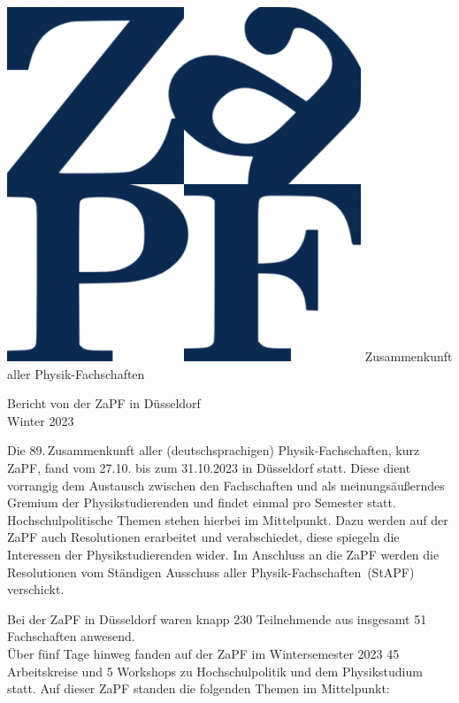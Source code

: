 \documentclass{scrartcl}
\begin{document}
\hspace{0.74\textwidth}
\begin{minipage}{0.25\textwidth}
      \vspace{-1cm}
      \centering
      \includegraphics[width=.89\textwidth]{logo.png}
      \small Zusammenkunft aller Physik-Fachschaften
\end{minipage}

\begin{center}
      \vspace{1.5cm}
      \huge{Bericht von der ZaPF in Düsseldorf \\ Winter 2023}
      \vspace{1cm}
\end{center}

Die 89.\,Zusammenkunft aller (deutschsprachigen) Physik-Fachschaften, kurz ZaPF, fand vom 27.10. bis zum 31.10.2023 in Düsseldorf statt. Diese dient vorrangig dem Austausch zwischen den Fachschaften und als meinungsäußerndes Gremium der Physikstudierenden und findet einmal pro Semester statt.
Hochschulpolitische Themen stehen hierbei im Mittelpunkt. 
Dazu werden auf der ZaPF auch Resolutionen erarbeitet und verabschiedet, diese spiegeln die Interessen der Physikstudierenden wider.
Im Anschluss an die ZaPF werden die Resolutionen vom Ständigen Ausschuss aller Physik-Fachschaften~(StAPF) verschickt.
 
Bei der ZaPF in Düsseldorf waren knapp 230 Teilnehmende aus insgesamt 51 Fachschaften anwesend.\\
Über fünf Tage hinweg fanden auf der ZaPF im Wintersemester 2023 45 Arbeitskreise und 5 Workshops zu Hochschulpolitik und dem Physikstudium statt. Auf dieser ZaPF standen die folgenden Themen im Mittelpunkt:
\end{document}
